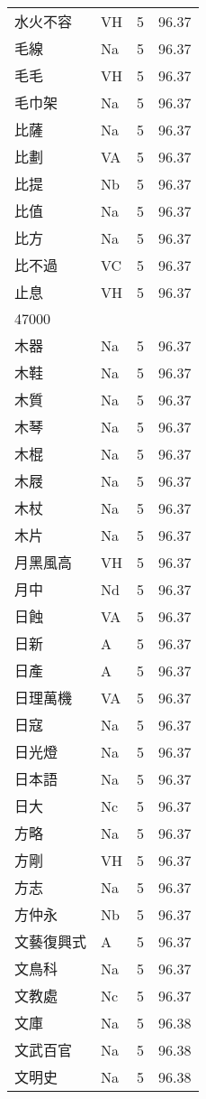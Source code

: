 \documentclass[twocolumn]{book}
\begin{document}
\begin{supertabular}{llrr}
水火不容 & VH & 5 &  96.37\\
毛線 & Na & 5 &  96.37\\
毛毛 & VH & 5 &  96.37\\
毛巾架 & Na & 5 &  96.37\\
比薩 & Na & 5 &  96.37\\
比劃 & VA & 5 &  96.37\\
比提 & Nb & 5 &  96.37\\
比值 & Na & 5 &  96.37\\
比方 & Na & 5 &  96.37\\
比不過 & VC & 5 &  96.37\\
止息 & VH & 5 &  96.37\\
47000\\
木器 & Na & 5 &  96.37\\
木鞋 & Na & 5 &  96.37\\
木質 & Na & 5 &  96.37\\
木琴 & Na & 5 &  96.37\\
木棍 & Na & 5 &  96.37\\
木屐 & Na & 5 &  96.37\\
木杖 & Na & 5 &  96.37\\
木片 & Na & 5 &  96.37\\
月黑風高 & VH & 5 &  96.37\\
月中 & Nd & 5 &  96.37\\
日蝕 & VA & 5 &  96.37\\
日新 & A & 5 &  96.37\\
日產 & A & 5 &  96.37\\
日理萬機 & VA & 5 &  96.37\\
日寇 & Na & 5 &  96.37\\
日光燈 & Na & 5 &  96.37\\
日本語 & Na & 5 &  96.37\\
日大 & Nc & 5 &  96.37\\
方略 & Na & 5 &  96.37\\
方剛 & VH & 5 &  96.37\\
方志 & Na & 5 &  96.37\\
方仲永 & Nb & 5 &  96.37\\
文藝復興式 & A & 5 &  96.37\\
文鳥科 & Na & 5 &  96.37\\
文教處 & Nc & 5 &  96.37\\
文庫 & Na & 5 &  96.38\\
文武百官 & Na & 5 &  96.38\\
文明史 & Na & 5 &  96.38\\

\end{supertabular}
\end{document}
